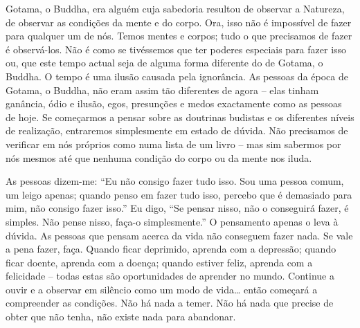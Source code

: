 Gotama, o Buddha, era alguém cuja sabedoria resultou de observar a Natureza, de
observar as condições da mente e do corpo. Ora, isso não é impossível de fazer
para qualquer um de nós. Temos mentes e corpos; tudo o que precisamos de fazer é
observá-los. Não é como se tivéssemos que ter poderes especiais para fazer isso
ou, que este tempo actual seja de alguma forma diferente do de Gotama, o Buddha.
O tempo é uma ilusão causada pela ignorância. As pessoas da época de Gotama, o
Buddha, não eram assim tão diferentes de agora -- elas tinham ganância, ódio e
ilusão, egos, presunções e medos exactamente como as pessoas de hoje. Se
começarmos a pensar sobre as doutrinas budistas e os diferentes níveis de
realização, entraremos simplesmente em estado de dúvida. Não precisamos de
verificar em nós próprios como numa lista de um livro -- mas sim sabermos por
nós mesmos até que nenhuma condição do corpo ou da mente nos iluda.

As pessoas dizem-me: ``Eu não consigo fazer tudo isso. Sou uma pessoa comum, um
leigo apenas; quando penso em fazer tudo isso, percebo que é demasiado para mim,
não consigo fazer isso.'' Eu digo, ``Se pensar nisso, não o conseguirá fazer, é
simples. Não pense nisso, faça-o simplesmente.'' O pensamento apenas o leva à
dúvida. As pessoas que pensam acerca da vida não conseguem fazer nada. Se vale a
pena fazer, faça. Quando ficar deprimido, aprenda com a depressão; quando ficar
doente, aprenda com a doença; quando estiver feliz, aprenda com a felicidade --
todas estas são oportunidades de aprender no mundo. Continue a ouvir e a
observar em silêncio como um modo de vida\ldots{} então começará a compreender
as condições. Não há nada a temer. Não há nada que precise de obter que não
tenha, não existe nada para abandonar.


